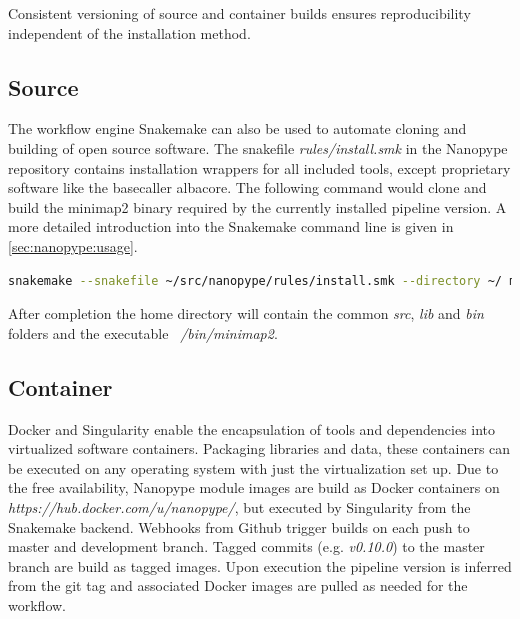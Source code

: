 Consistent versioning of source and container builds ensures reproducibility independent of the installation method.


\subsection{Source}

The workflow engine Snakemake can also be used to automate cloning and building of open source software. The snakefile \textit{rules/install.smk} in the Nanopype repository contains installation wrappers for all included tools, except proprietary software like the basecaller albacore. The following command would clone and build the minimap2 binary required by the currently installed pipeline version. A more detailed introduction into the Snakemake command line is given in \ref{sec:nanopype:usage}. 

\begin{lstlisting}[language=sh, caption=Snakemake tool installation example]
snakemake --snakefile ~/src/nanopype/rules/install.smk --directory ~/ minimap2
\end{lstlisting}

After completion the home directory will contain the common \textit{src}, \textit{lib} and \textit{bin} folders and the executable \textit{~/bin/minimap2}. 



\subsection{Container}

Docker and Singularity enable the encapsulation of tools and dependencies into virtualized software containers. Packaging libraries and data, these containers can be executed on any operating system with just the virtualization set up. Due to the free availability, Nanopype module images are build as Docker containers on \textit{https://hub.docker.com/u/nanopype/}, but executed by Singularity from the Snakemake backend. Webhooks from Github trigger builds on each push to master and development branch. Tagged commits (e.g. \textit{v0.10.0}) to the master branch are build as tagged images. Upon execution the pipeline version is inferred from the git tag and associated Docker images are pulled as needed for the workflow.


